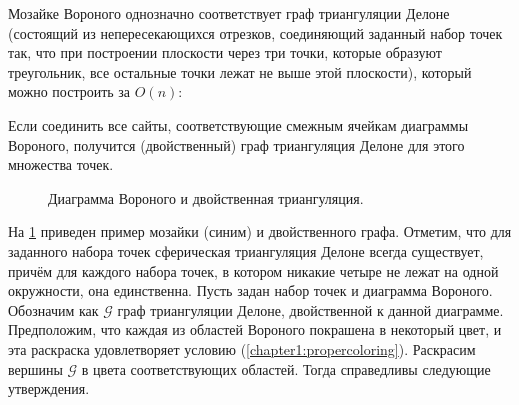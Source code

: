Мозайке Вороного однозначно соответствует граф триангуляции Делоне (состоящий из непересекающихся отрезков, соединяющий заданный набор точек так, что при построении плоскости через три точки, которые образуют треугольник, все остальные точки лежат не выше этой плоскости), который можно построить за $O(n)$:

\begin{theorem1}
Если соединить все сайты, соответствующие смежным ячейкам диаграммы Вороного, получится (двойственный) граф триангуляция Делоне для этого множества точек.
\end{theorem1}

\begin{figure}[h]
\centering
\captionsetup{justification=centering}
\caption{Диаграмма Вороного и двойственная триангуляция.}
\label{chapter1:fig:triangexample}
\end{figure}

На \figurename{ \ref{chapter1:fig:triangexample}} приведен пример мозайки (синим) и двойственного графа.
Отметим, что для заданного набора точек сферическая триангуляция Делоне всегда существует, причём для каждого набора точек, в котором никакие четыре не лежат на одной окружности, она единственна.
Пусть задан набор точек и диаграмма Вороного. Обозначим как $\mathcal{G}$ граф триангуляции Делоне, двойственной к данной диаграмме. Предположим, что каждая из областей Вороного покрашена в некоторый цвет, и эта раскраска удовлетворяет условию 
(\ref{chapter1:propercoloring}). Раскрасим вершины $\mathcal{G}$ в цвета соответствующих областей. Тогда справедливы следующие утверждения.

